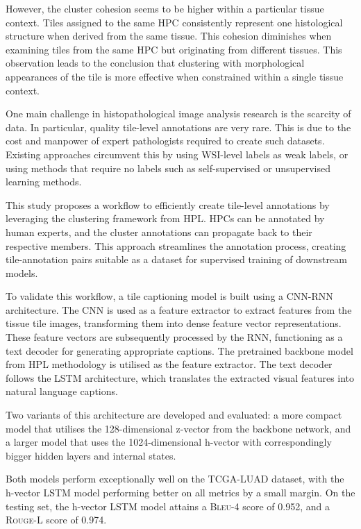 \documentclass{l4proj}
\begin{document}
However, the cluster cohesion seems to be higher within a particular tissue context. Tiles assigned to the same HPC consistently represent one histological structure when derived from the same tissue. This cohesion diminishes when examining tiles from the same HPC but originating from different tissues. This observation leads to the conclusion that clustering with morphological appearances of the tile is more effective when constrained within a single tissue context.

One main challenge in histopathological image analysis research is the scarcity of data. In particular, quality tile-level annotations are very rare. This is due to the cost and manpower of expert pathologists required to create such datasets. Existing approaches circumvent this by using WSI-level labels as weak labels, or using methods that require no labels such as self-supervised or unsupervised learning methods.

This study proposes a workflow to efficiently create tile-level annotations by leveraging the clustering framework from HPL. HPCs can be annotated by human experts, and the cluster annotations can propagate back to their respective members. This approach streamlines the annotation process, creating tile-annotation pairs suitable as a dataset for supervised training of downstream models.

To validate this workflow, a tile captioning model is built using a CNN-RNN architecture. The CNN is used as a feature extractor to extract features from the tissue tile images, transforming them into dense feature vector representations. These feature vectors are subsequently processed by the RNN, functioning as a text decoder for generating appropriate captions. The pretrained backbone model from HPL methodology is utilised as the feature extractor. The text decoder follows the LSTM architecture, which translates the extracted visual features into natural language captions.

Two variants of this architecture are developed and evaluated: a more compact model that utilises the 128-dimensional z-vector from the backbone network, and a larger model that uses the 1024-dimensional h-vector with correspondingly bigger hidden layers and internal states.

Both models perform exceptionally well on the TCGA-LUAD dataset, with the h-vector LSTM model performing better on all metrics by a small margin. On the testing set, the h-vector LSTM model attains a \textsc{Bleu-4} score of 0.952, and a \textsc{Rouge-L} score of 0.974. 
\end{document}
